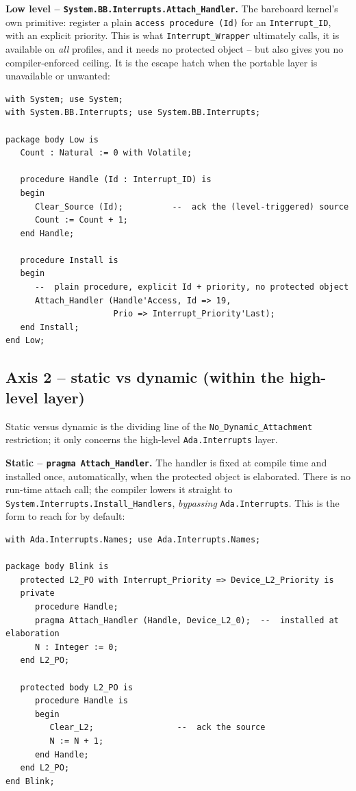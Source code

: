 \textbf{Low level -- \texttt{System.BB.Interrupts.Attach\_Handler}.} The
bareboard kernel's own primitive: register a plain \texttt{access procedure (Id)}
for an \texttt{Interrupt\_ID}, with an explicit priority. This is what
\texttt{Interrupt\_Wrapper} ultimately calls, it is available on \emph{all}
profiles, and it needs no protected object -- but also gives you no
compiler-enforced ceiling. It is the escape hatch when the portable layer is
unavailable or unwanted:

\begin{lstlisting}
with System; use System;
with System.BB.Interrupts; use System.BB.Interrupts;

package body Low is
   Count : Natural := 0 with Volatile;

   procedure Handle (Id : Interrupt_ID) is
   begin
      Clear_Source (Id);          --  ack the (level-triggered) source
      Count := Count + 1;
   end Handle;

   procedure Install is
   begin
      --  plain procedure, explicit Id + priority, no protected object
      Attach_Handler (Handle'Access, Id => 19,
                      Prio => Interrupt_Priority'Last);
   end Install;
end Low;
\end{lstlisting}

\subsection{Axis 2 -- static vs dynamic (within the high-level layer)}

Static versus dynamic is the dividing line of the \texttt{No\_Dynamic\_Attachment}
restriction; it only concerns the high-level \texttt{Ada.Interrupts} layer.

\textbf{Static -- \texttt{pragma Attach\_Handler}.} The handler is fixed at
compile time and installed once, automatically, when the protected object is
elaborated. There is no run-time attach call; the compiler lowers it straight to
\texttt{System.Interrupts.Install\_Handlers}, \emph{bypassing}
\texttt{Ada.Interrupts}. This is the form to reach for by default:

\begin{lstlisting}
with Ada.Interrupts.Names; use Ada.Interrupts.Names;

package body Blink is
   protected L2_PO with Interrupt_Priority => Device_L2_Priority is
   private
      procedure Handle;
      pragma Attach_Handler (Handle, Device_L2_0);  --  installed at elaboration
      N : Integer := 0;
   end L2_PO;

   protected body L2_PO is
      procedure Handle is
      begin
         Clear_L2;                 --  ack the source
         N := N + 1;
      end Handle;
   end L2_PO;
end Blink;
\end{lstlisting}

